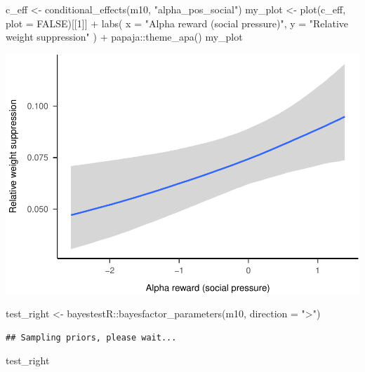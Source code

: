 \documentclass[
]{article}
\newenvironment{Shaded}{\begin{snugshade}}{\end{snugshade}}
\newcommand{\AttributeTok}[1]{\textcolor[rgb]{0.77,0.63,0.00}{#1}}
\newcommand{\ConstantTok}[1]{\textcolor[rgb]{0.00,0.00,0.00}{#1}}
\newcommand{\DecValTok}[1]{\textcolor[rgb]{0.00,0.00,0.81}{#1}}
\newcommand{\FunctionTok}[1]{\textcolor[rgb]{0.00,0.00,0.00}{#1}}
\newcommand{\NormalTok}[1]{#1}
\newcommand{\OtherTok}[1]{\textcolor[rgb]{0.56,0.35,0.01}{#1}}
\newcommand{\SpecialCharTok}[1]{\textcolor[rgb]{0.00,0.00,0.00}{#1}}
\newcommand{\StringTok}[1]{\textcolor[rgb]{0.31,0.60,0.02}{#1}}
\begin{document}
\begin{Shaded}
\begin{Highlighting}[]
\NormalTok{c\_eff }\OtherTok{\textless{}{-}} \FunctionTok{conditional\_effects}\NormalTok{(m10, }\StringTok{"alpha\_pos\_social"}\NormalTok{)}
\NormalTok{my\_plot }\OtherTok{\textless{}{-}} \FunctionTok{plot}\NormalTok{(c\_eff, }\AttributeTok{plot =} \ConstantTok{FALSE}\NormalTok{)[[}\DecValTok{1}\NormalTok{]] }\SpecialCharTok{+}
  \FunctionTok{labs}\NormalTok{(}
    \AttributeTok{x =} \StringTok{"Alpha reward (social pressure)"}\NormalTok{,}
    \AttributeTok{y =} \StringTok{"Relative weight suppression"}
\NormalTok{  ) }\SpecialCharTok{+}
\NormalTok{  papaja}\SpecialCharTok{::}\FunctionTok{theme\_apa}\NormalTok{()}
\NormalTok{my\_plot}
\end{Highlighting}
\end{Shaded}

\includegraphics{046_weight_history_alpha_files/figure-latex/unnamed-chunk-10-1.pdf}

\begin{Shaded}
\begin{Highlighting}[]
\NormalTok{test\_right }\OtherTok{\textless{}{-}}\NormalTok{ bayestestR}\SpecialCharTok{::}\FunctionTok{bayesfactor\_parameters}\NormalTok{(m10, }\AttributeTok{direction =} \StringTok{"\textgreater{}"}\NormalTok{)}
\end{Highlighting}
\end{Shaded}

\begin{verbatim}
## Sampling priors, please wait...
\end{verbatim}

\begin{Shaded}
\begin{Highlighting}[]
\NormalTok{test\_right}
\end{Highlighting}
\end{Shaded}
\end{document}
